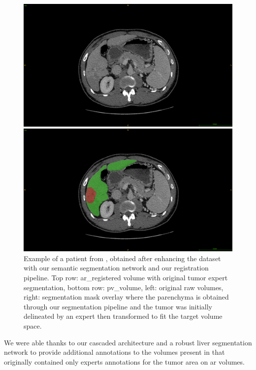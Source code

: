 \begin{figure}[ht!]
\vspace{0.8cm}
\begin{minipage}{0.45\linewidth}
\includegraphics[width=0.9\linewidth]{../HistologicalGradePrediction/images/GDB/GDB_Pat77_slice261_raw_PV}
\end{minipage}
\hspace{0.3cm}
\begin{minipage}{0.45\linewidth}
\includegraphics[width=0.9\linewidth]{../HistologicalGradePrediction/images/GDB/GDB_Pat77_slice261_PV_liverTumorPred}
\end{minipage}
\caption{Example of a patient from \textbf{}, obtained after enhancing the dataset with our semantic segmentation network and our registration pipeline. Top row: \ac{ar}\_registered volume with original tumor expert segmentation, bottom row: \ac{pv}\_volume, left: original raw volumes, right: segmentation mask overlay where the parenchyma is obtained through our segmentation pipeline and the tumor was initially delineated by an expert then transformed to fit the target volume space.}
\label{fig:gDbRegisteredPatient}
\end{figure}


We were able thanks to our cascaded architecture and a robust liver
segmentation network to provide additional annotations to the volumes present in \textbf{} that
originally contained only experts annotations for the tumor area on \ac{ar} volumes.

